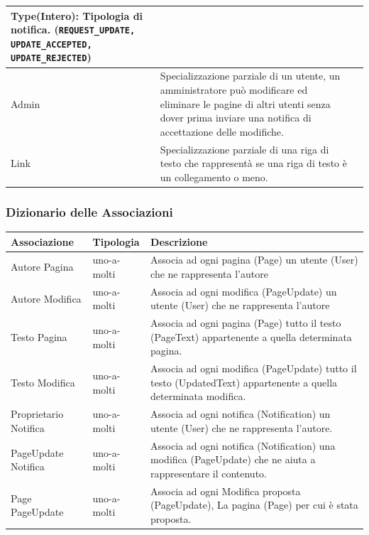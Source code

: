 \documentclass{article}
\begin{document}
\begin{table}[H]
\begin{tabularx}{\textwidth}{|l|X|X|}
		    \textbf{Type}(Intero): Tipologia di notifica. (\texttt{REQUEST\_UPDATE, UPDATE\_ACCEPTED, UPDATE\_REJECTED})
			\\
			\hline
			Admin & Specializzazione parziale di un utente, un amministratore pu\`o modificare ed eliminare le pagine di altri utenti senza dover prima inviare una notifica di accettazione delle modifiche.& 
			\\
			\hline
			Link & Specializzazione parziale di una riga di testo che rappresent\`a se una riga di testo \`e un collegamento o meno.& 
			\\
			\hline

		\end{tabularx}
		
	\end{table}
	
	{\subsubsection{Dizionario delle Associazioni}}
	
	\begin{table}[H]
		\centering
		\small %
		\setlength{\tabcolsep}{6pt} %
		\renewcommand{\arraystretch}{1.2} %
		
		
		\begin{tabularx}{\textwidth}{|l|l|X|}
			\hline
			\textbf{Associazione} &\textbf{Tipologia}  & \textbf{Descrizione} \\
			\hline
			Autore Pagina & uno-a-molti  & Associa ad ogni pagina (Page) un utente (User) che ne rappresenta l'autore
			\\
			\hline
			Autore Modifica & uno-a-molti  & Associa ad ogni modifica (PageUpdate) un utente (User) che ne rappresenta l'autore
			\\
			\hline
			Testo Pagina & uno-a-molti  & Associa ad ogni pagina (Page) tutto il testo (PageText) appartenente a quella determinata pagina.
			\\
			\hline
			Testo Modifica & uno-a-molti  & Associa ad ogni modifica (PageUpdate) tutto il testo (UpdatedText) appartenente a quella determinata modifica.
			\\
			\hline
			Proprietario Notifica & uno-a-molti  & Associa ad ogni notifica (Notification) un utente (User) che ne rappresenta l'autore.
			\\
			\hline
			PageUpdate Notifica & uno-a-molti  & Associa ad ogni notifica (Notification) una modifica (PageUpdate) che ne aiuta a rappresentare il contenuto.
			\\
			\hline
			Page PageUpdate & uno-a-molti  & Associa ad ogni Modifica proposta (PageUpdate), La pagina (Page) per cui \`e stata proposta. 
			\\
			\hline
		\end{tabularx}
		
	
		
	\end{table}
\end{document}
